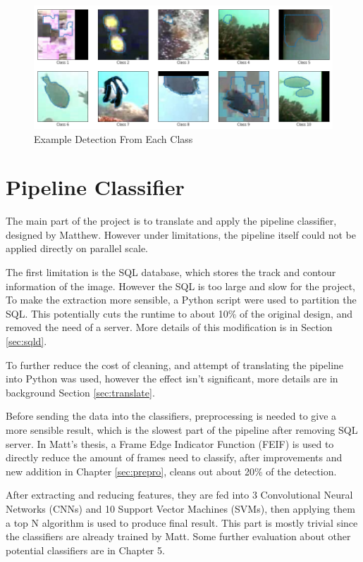 \documentclass[bsc,logo,twoside,fullspacing,parskip]{infthesis}
\begin{document}
\begin{figure}[!b]
    \centering
    \includegraphics[scale=0.44]{graph/class_sample.png}
    \caption{Example Detection From Each Class}
    \label{fig:classes}
\end{figure}

\section{Pipeline Classifier}

The main part of the project is to translate and apply the pipeline classifier, designed by Matthew. 
However under limitations, the pipeline itself could not be applied directly on parallel scale.

The first limitation is the SQL database, which stores the track and contour information of the image. 
However the SQL is too large and slow for the project, To make the extraction more sensible, a Python script were used to partition the SQL.
This potentially cuts the runtime to about 10\% of the original design, and removed the need of a server. 
More details of this modification is in Section \ref{sec:sqld}.

To further reduce the cost of cleaning, and attempt of translating the pipeline into Python was used, however the effect isn't significant, more details are in background Section \ref{sec:translate}.

Before sending the data into the classifiers, preprocessing is needed to give a more sensible result, which is the slowest part of the pipeline after removing SQL server. 
In Matt's thesis, a Frame Edge Indicator Function (FEIF) is used to directly reduce the amount of frames need to classify, after improvements and new addition in Chapter \ref{sec:prepro}, cleans out about 20\% of the detection.

After extracting and reducing features, they are fed into 3 Convolutional Neural Networks (CNNs) and 10 Support Vector Machines (SVMs), then applying them a top N algorithm is used to produce final result. This part is mostly trivial since the classifiers are already trained by Matt. Some further evaluation about other potential classifiers are in Chapter 5.
\end{document}
